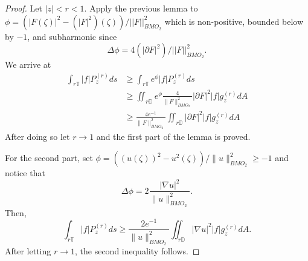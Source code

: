 \documentclass[12pt]{amsart}
\theoremstyle{definition}
\theoremstyle{remark}
\numberwithin{equation}{section}
\newcommand{\D}{\mathbb{D}}
\newcommand{\T}{\mathbb{T}}
\begin{document}
\begin{proof} Let $|z|< r < 1$.  Apply the previous lemma to $\phi = (|F(\zeta)|^2 -
  (|F|^2)(\zeta))/||F||^2_{BMO_2}$ which is non-positive, bounded below
  by $-1$, and subharmonic since
\[
\Delta \phi = 4 (|\partial F|^2) /||F||^2_{BMO_2}.
\]
We arrive at
\[
\begin{aligned}
\int_{r\T} |f| P^{(r)}_z ds &\geq \int_{r\T} e^{\phi} |f| P^{(r)}_z ds \\
&\geq \iint_{r\D} e^{\phi} \frac{4}{\|F\|^2_{BMO_2}}|\partial F|^2 |f| g^{(r)}_z dA \\
& \geq \frac{4e^{-1}}{\|F\|^2_{BMO_2}} \iint_{r\D} |\partial F|^2 |f| g^{(r)}_z dA
\end{aligned}
\]
After doing so let $r \to 1$ and the first part of the lemma is
proved. 

For the second part, set $\phi = ((u(\zeta))^2 -
u^2(\zeta))/\|u\|^2_{BMO_2} \geq -1$ and 
notice that
\[
\Delta \phi = 2\frac{|\nabla u|^2}{\|u\|^2_{BMO_2}}.
\]
Then,
\[
\int_{r\T} |f| P^{(r)}_{z} ds \geq \frac{2e^{-1}}{\|u\|^2_{BMO_2}}
\iint_{r\D} |\nabla u |^2 |f| g^{(r)}_z dA.
\]
After letting $r\to 1$, the second inequality follows.
\end{proof}
\end{document}
